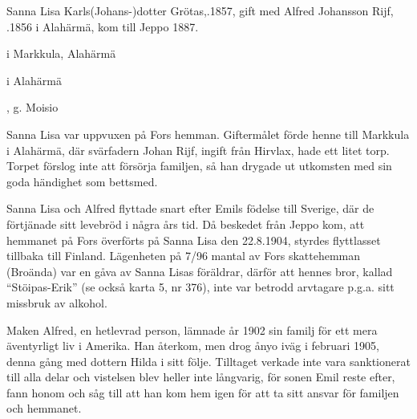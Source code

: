 Sanna Lisa Karls(Johans-)dotter Grötas,.1857, gift med Alfred Johansson Rijf, .1856 i Alahärmä, kom till Jeppo 1887.
\begin{jhchildren}
  \item {} i Markkula, Alahärmä
  \item {} i Alahärmä
  \item {}, g. Moisio
  \item {}
\end{jhchildren}
Sanna Lisa var uppvuxen på Fors hemman. Giftermålet förde henne till Markkula i Alahärmä, där svärfadern Johan Rijf, ingift från Hirvlax, hade ett litet torp. Torpet förslog inte att försörja familjen, så han drygade ut utkomsten med sin goda händighet som bettsmed.

Sanna Lisa och Alfred flyttade snart efter Emils födelse till Sverige, där de förtjänade sitt levebröd i några års tid. Då  beskedet från Jeppo kom, att hemmanet på Fors överförts på Sanna Lisa den 22.8.1904, styrdes flyttlasset tillbaka till Finland. Lägenheten på 7/96 mantal av Fors skattehemman (Broända) var en gåva av Sanna Lisas föräldrar, därför att hennes bror, kallad ``Stöipas-Erik'' (se också karta 5, nr 376), inte var betrodd arvtagare p.g.a. sitt missbruk av alkohol.

Maken Alfred, en hetlevrad person, lämnade år 1902 sin familj för ett mera äventyrligt liv i Amerika. Han återkom, men drog ånyo iväg i	februari 1905, denna gång med dottern Hilda i sitt följe. Tilltaget	verkade inte vara sanktionerat till alla delar och vistelsen blev heller	inte långvarig, för sonen Emil reste efter, fann honom och såg till att	han kom hem igen för att ta sitt ansvar för familjen och hemmanet.



